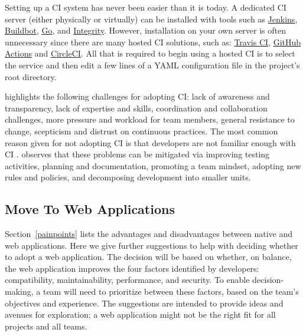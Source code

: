 \documentclass[final, 3p, times, authoryear]{elsarticle}
\begin{document}
Setting up a CI system has never been easier than it is today.  A dedicated CI
server (either physically or virtually) can be installed with tools such as
\href{https://www.jenkins.io/} {Jenkins}, \href{http://buildbot.net/}
{Buildbot}, \href{https://www.gocd.org/} {Go}, and
\href{http://integrity.github.io/} {Integrity}. However, installation on your
own server is often unnecessary since there are many hosted CI solutions, such
as: \href{https://travis-ci.org/} {Travis CI},
\href{https://github.com/features/actions} {GitHub Actions} and
\href{https://circleci.com/} {CircleCI}.  All that is required to begin using a
hosted CI is to select the service and then edit a few lines of a YAML
configuration file in the project's root directory.

\citet{ShahinEtAl2017} highlights the following challenges for adopting CI: lack
of awareness and transparency, lack of expertise and skills, coordination and
collaboration challenges, more pressure and workload for team members, general
resistance to change, scepticism and distrust on continuous practices. The most
common reason given for not adopting CI is that developers are not familiar
enough with CI \citep{HiltonEtAl2016}.  \citet{ShahinEtAl2017} observes that
these problems can be mitigated via improving testing activities, planning and
documentation, promoting a team mindset, adopting new rules and policies, and
decomposing development into smaller units.

\subsection{Move To Web Applications} \label{sec_recommendations_tech_stack}

Section~\ref{painpoints} lists the advantages and disadvantages between native
and web applications. Here we give further suggestions to help with deciding
whether to adopt a web application.  The decision will be based on whether, on
balance, the web application improves the four factors identified by developers:
compatibility, maintainability, performance, and security. To enable
decision-making, a team will need to prioritize between these factors, based on
the team's objectives and experience. The suggestions are intended to provide
ideas and avenues for exploration; a web application might not be the right fit
for all projects and all teams.
\end{document}
